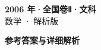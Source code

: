 \documentclass[zihao=-4, a4paper]{ctexart}
\begin{document}
\begin{center}
  {\Large\bfseries 2006 年·全国卷Ⅱ·文科}\\[4pt]
  {\large 数学 · 解析版}
\end{center}
\medskip
{}

\clearpage
{}
\begin{center}{\Large\bfseries 参考答案与详细解析}\end{center}
\medskip

\end{document}
